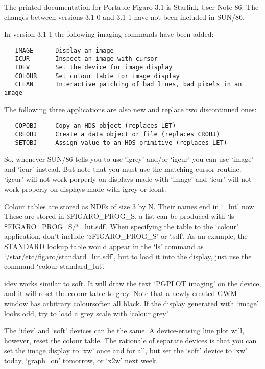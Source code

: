    The printed documentation for Portable Figaro 3.1 is Starlink User
   Note 86. The changes between versions 3.1-0 and 3.1-1 have not been
   included in SUN/86.

   In version 3.1-1 the following imaging commands have been added:

\begin{verbatim}
   IMAGE      Display an image
   ICUR       Inspect an image with cursor
   IDEV       Set the device for image display
   COLOUR     Set colour table for image display
   CLEAN      Interactive patching of bad lines, bad pixels in an image
\end{verbatim}

   The following three applications are also new and replace two
   discontinued ones:

\begin{verbatim}
   COPOBJ     Copy an HDS object (replaces LET)
   CREOBJ     Create a data object or file (replaces CROBJ)
   SETOBJ     Assign value to an HDS primitive (replaces LET)
\end{verbatim}

   So, whenever SUN/86 tells you to use `igrey' and/or `igcur' you can
   use `image' and `icur' instead. But note that you must use the
   matching cursor routine. `igcur' will not work porperly on displays
   made with `image' and `icur' will not work properly on displays made
   with igrey or icont.

   Colour tables are stored as NDFs of size 3 by N. Their names end in
   `\_lut' now. These are stored in \$FIGARO\_PROG\_S, a list can be
   produced with `ls \$FIGARO\_PROG\_S/*\_lut.sdf'. When specifying the
   table to the `colour' application, don't include `\$FIGARO\_PROG\_S' or
   `.sdf'. As an example, the STANDARD lookup table would appear in the
   `ls' command as `/star/etc/figaro/standard\_lut.sdf', but to load it
   into the display, just use the command `colour standard\_lut'.

   idev works similar to soft. It will draw the text `PGPLOT imaging' on
   the device, and it will reset the colour table to grey. Note that a
   newly created GWM window has arbitrary colours\latorhtm{---}{-}often all
   black. If
   the display generated with `image' looks odd, try to load a grey
   scale with `colour grey'.

   The `idev' and `soft' devices can be the same. A device-erasing line
   plot will, however, reset the colour table. The rationale of separate
   devices is that you can set the image display to `xw' once and for
   all, but set the `soft' device to `xw' today, `graph\_on' tomorrow, or
   `x2w' next week.


